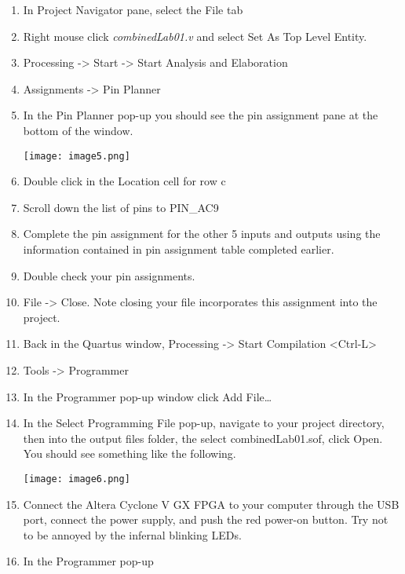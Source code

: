 \begin{enumerate}
        \def\labelenumi{\arabic{enumi}.}
    \item
        In Project Navigator pane, select the File tab
    \item
        Right mouse click \emph{combinedLab01.v} and select Set As Top Level
        Entity.
    \item
        Processing -\textgreater{} Start -\textgreater{} Start Analysis and
        Elaboration
    \item
        Assignments -\textgreater{} Pin Planner
    \item
        In the Pin Planner pop-up you should see the pin assignment pane at
        the bottom of the window.

        \texttt{[image: image5.png]}

    \item
        Double click in the Location cell for row c
    \item
        Scroll down the list of pins to PIN\_AC9
    \item
        Complete the pin assignment for the other 5 inputs and outputs using
        the information contained in pin assignment table completed earlier.
    \item
        Double check your pin assignments.
    \item
        File -\textgreater{} Close. Note closing your file incorporates this
        assignment into the project.
    \item
        Back in the Quartus window, Processing -\textgreater{} Start
        Compilation \textless Ctrl-L\textgreater{}
    \item
        Tools -\textgreater{} Programmer
    \item
        In the Programmer pop-up window click Add File\ldots{}
    \item
        In the Select Programming File pop-up, navigate to your project
        directory, then into the output files folder, the select
        combinedLab01.sof, click Open. You should see something like the
        following.

        \texttt{[image: image6.png]}

    \item
        Connect the Altera Cyclone V GX FPGA to your computer through the USB
        port, connect the power supply, and push the red power-on button. Try
        not to be annoyed by the infernal blinking LEDs.
    \item
        In the Programmer pop-up


\end{enumerate}
